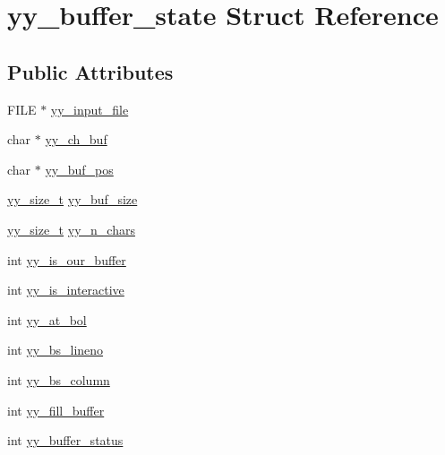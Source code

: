 \hypertarget{structyy__buffer__state}{}\section{yy\+\_\+buffer\+\_\+state Struct Reference}
\label{structyy__buffer__state}
\subsection*{Public Attributes}
\begin{DoxyCompactItemize}
\item 
F\+I\+L\+E $\ast$ \hyperlink{structyy__buffer__state_a4843d1422e3276b636d475a3095bd948}{yy\+\_\+input\+\_\+file}
\item 
char $\ast$ \hyperlink{structyy__buffer__state_ad7b8df8d8a4688e57b0b8d3ca75adc85}{yy\+\_\+ch\+\_\+buf}
\item 
char $\ast$ \hyperlink{structyy__buffer__state_a58aa927f098b99d99e75da80f9b681ef}{yy\+\_\+buf\+\_\+pos}
\item 
\hyperlink{lex_8yy_8c_ad557845057f187eec4be07e2717d2afa}{yy\+\_\+size\+\_\+t} \hyperlink{structyy__buffer__state_a48302f5f3477a9c78bbddf56d356ef54}{yy\+\_\+buf\+\_\+size}
\item 
\hyperlink{lex_8yy_8c_ad557845057f187eec4be07e2717d2afa}{yy\+\_\+size\+\_\+t} \hyperlink{structyy__buffer__state_afcc44872643f513e79b43c2b1f334a67}{yy\+\_\+n\+\_\+chars}
\item 
int \hyperlink{structyy__buffer__state_a80ce2431c70dc4f89ced487f18449465}{yy\+\_\+is\+\_\+our\+\_\+buffer}
\item 
int \hyperlink{structyy__buffer__state_abf5c70eea75581b58c0ee7bd31b14490}{yy\+\_\+is\+\_\+interactive}
\item 
int \hyperlink{structyy__buffer__state_a9d60c60af6e1a6f69de16871fd64f85f}{yy\+\_\+at\+\_\+bol}
\item 
int \hyperlink{structyy__buffer__state_a818e94bc9c766e683c60df1e9fd01199}{yy\+\_\+bs\+\_\+lineno}
\item 
int \hyperlink{structyy__buffer__state_a10c4fcd8be759e6bf11e6d3e8cdb0307}{yy\+\_\+bs\+\_\+column}
\item 
int \hyperlink{structyy__buffer__state_a63d2afbb1d79a3fc63df9e12626f827d}{yy\+\_\+fill\+\_\+buffer}
\item 
int \hyperlink{structyy__buffer__state_a70fd925d37a2f0454fbd0def675d106c}{yy\+\_\+buffer\+\_\+status}
\end{DoxyCompactItemize}


